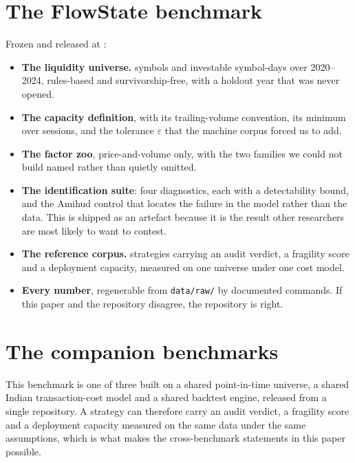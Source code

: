 \documentclass[11pt,a4paper]{article}
\begin{document}
\section{The FlowState benchmark}
\label{sec:release}

Frozen and released at \repo:

\begin{itemize}
\item \textbf{The liquidity universe.} \fsNSymbols{} symbols and
  \fsNInvestableSymbolDays{} investable symbol-days over 2020--2024, rules-based and
  survivorship-free, with a holdout year that was never opened.
\item \textbf{The capacity definition}, with its trailing-volume convention, its minimum over
  sessions, and the tolerance $\varepsilon$ that the machine corpus forced us to add.
\item \textbf{The factor zoo}, price-and-volume only, with the two families we could not build
  named rather than quietly omitted.
\item \textbf{The identification suite}: four diagnostics, each with a detectability bound, and
  the Amihud control that locates the failure in the model rather than the data. This is shipped
  as an artefact because it is the result other researchers are most likely to want to contest.
\item \textbf{The reference corpus.} \fsCorpusAllThree{} strategies carrying an audit verdict, a
  fragility score and a deployment capacity, measured on one universe under one cost model.
\item \textbf{Every number}, regenerable from \texttt{data/raw/} by documented commands. If this
  paper and the repository disagree, the repository is right.
\end{itemize}

\section{The companion benchmarks}
\label{sec:companions}

This benchmark is one of three built on a shared point-in-time universe, a shared Indian
transaction-cost model and a shared backtest engine, released from a single repository. A
strategy can therefore carry an audit verdict, a fragility score and a deployment capacity
measured on the same data under the same assumptions, which is what makes the
cross-benchmark statements in this paper possible.
\end{document}
